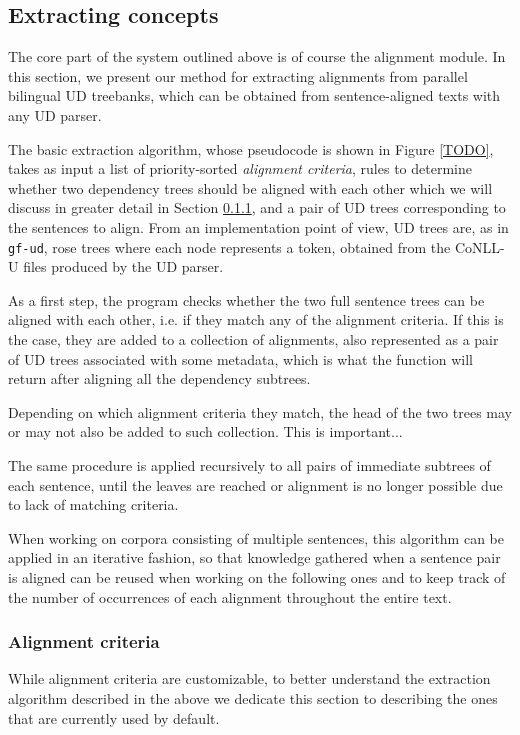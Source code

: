 \documentclass[11pt]{article}
\begin{document}
\subsection{Extracting concepts} 
The core part of the system outlined above is of course the alignment module. In this section, we present our method for extracting alignments from parallel bilingual UD treebanks, which can be obtained from sentence-aligned texts with any UD parser.

The basic extraction algorithm, whose pseudocode is shown in Figure \ref{TODO}, takes as input a list of priority-sorted \textit{alignment criteria}, rules to determine whether two dependency trees should be aligned with each other which we will discuss in greater detail in Section \ref{criteria}, and a pair of UD trees corresponding to the sentences to align.
From an implementation point of view, UD trees are, as in \texttt{gf-ud}, rose trees where each node represents a token,  obtained from the CoNLL-U files produced by the UD parser.


As a first step, the program checks whether the two full sentence trees can be aligned with each other, i.e. if they match any of the alignment criteria. If this is the case, they are added to a collection of alignments, also represented as a pair of UD trees associated with some metadata, which is what the function will return after aligning all the dependency subtrees. %

Depending on which alignment criteria they match, the head of the two trees may or may not also be added to such collection. This is important... %

The same procedure is applied recursively to all pairs of immediate subtrees of each sentence, until the leaves are reached or alignment is no longer possible due to lack of matching criteria.  %


When working on corpora consisting of multiple sentences, this algorithm can be applied in an iterative fashion, so that knowledge gathered when a sentence pair is aligned can be reused when working on the following ones and to keep track of the number of occurrences of each alignment throughout the entire text.

\subsubsection{Alignment criteria} \label{criteria}
While alignment criteria are customizable, to better understand the extraction algorithm described in the above we dedicate this section to describing the ones that are currently used by default.
\end{document}
